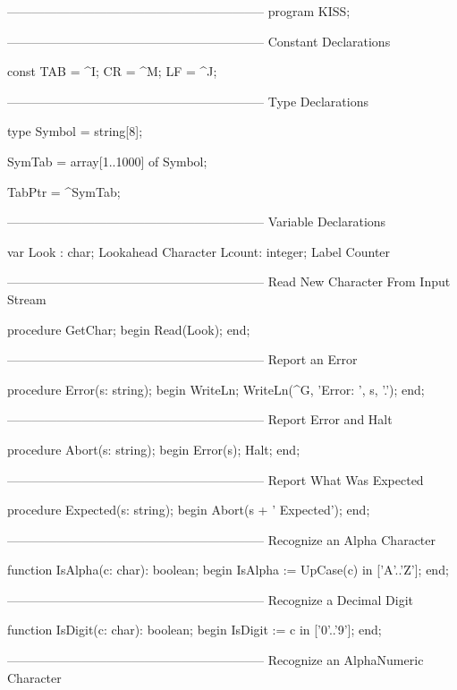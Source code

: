 \documentclass[float=false, crop=false]{standalone}
\begin{document}
\begin{code}
{--------------------------------------------------------------}
program KISS;

{--------------------------------------------------------------}
{ Constant Declarations }

const TAB = ^I;
      CR  = ^M;
      LF  = ^J;

{--------------------------------------------------------------}
{ Type Declarations  }

type Symbol = string[8];

     SymTab = array[1..1000] of Symbol;

     TabPtr = ^SymTab;


{--------------------------------------------------------------}
{ Variable Declarations }

var Look  : char;              { Lookahead Character }
    Lcount: integer;           { Label Counter       }


{--------------------------------------------------------------}
{ Read New Character From Input Stream }

procedure GetChar;
begin
   Read(Look);
end;


{--------------------------------------------------------------}
{ Report an Error }

procedure Error(s: string);
begin
   WriteLn;
   WriteLn(^G, 'Error: ', s, '.');
end;


{--------------------------------------------------------------}
{ Report Error and Halt }

procedure Abort(s: string);
begin
   Error(s);
   Halt;
end;


{--------------------------------------------------------------}
{ Report What Was Expected }

procedure Expected(s: string);
begin
   Abort(s + ' Expected');
end;

{--------------------------------------------------------------}
{ Recognize an Alpha Character }

function IsAlpha(c: char): boolean;
begin
   IsAlpha := UpCase(c) in ['A'..'Z'];
end;


{--------------------------------------------------------------}
{ Recognize a Decimal Digit }

function IsDigit(c: char): boolean;
begin
   IsDigit := c in ['0'..'9'];
end;


{--------------------------------------------------------------}
{ Recognize an AlphaNumeric Character }


\end{code}
\end{document}
